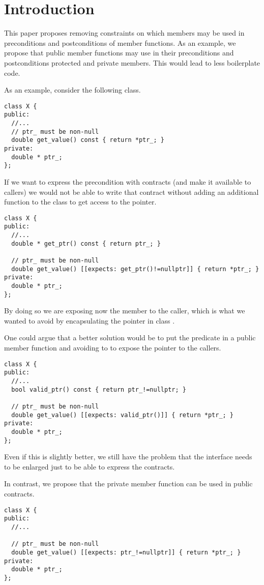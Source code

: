 \section{Introduction}

This paper proposes removing constraints on which members may be used in
preconditions and postconditions of member functions. As an example, we propose
that public member functions may use in their preconditions and postconditions
protected and private members. This would lead to less boilerplate code.

As an example, consider the following class.

\begin{lstlisting}
class X {
public:
  //...
  // ptr_ must be non-null
  double get_value() const { return *ptr_; }
private:
  double * ptr_; 
};
\end{lstlisting}

If we want to express the precondition with contracts (and make it available to
callers) we would not be able to write that contract without adding an
additional function to the class to get access to the pointer.

\begin{lstlisting}
class X {
public:
  //...
  double * get_ptr() const { return ptr_; }

  // ptr_ must be non-null
  double get_value() [[expects: get_ptr()!=nullptr]] { return *ptr_; }
private:
  double * ptr_; 
};
\end{lstlisting}

By doing so we are exposing now the  member to the caller, which is what we
wanted to avoid by encapsulating the pointer in class .

One could argue that a better solution would be to put the predicate in a public
member function and avoiding to to expose the pointer to the callers.

\begin{lstlisting}
class X {
public:
  //...
  bool valid_ptr() const { return ptr_!=nullptr; }

  // ptr_ must be non-null
  double get_value() [[expects: valid_ptr()]] { return *ptr_; }
private:
  double * ptr_; 
};
\end{lstlisting}

Even if this is slightly better, we still have the problem that the interface
needs to be enlarged just to be able to express the contracts.

In contrast, we propose that the private member function can be used in public
contracts.

\begin{lstlisting}
class X {
public:
  //...

  // ptr_ must be non-null
  double get_value() [[expects: ptr_!=nullptr]] { return *ptr_; }
private:
  double * ptr_; 
};
\end{lstlisting}

